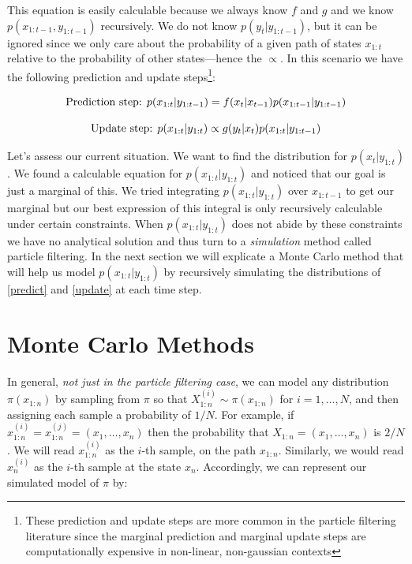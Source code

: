 \documentclass{article}
\begin{document}
\noindent
This equation is easily calculable because we always know $f$ and $g$ and we know $p(x_{1:t-1},y_{1:t-1})$ recursively. We do not know $p(y_t|y_{1:t-1})$, but it can be ignored since we only care about the probability of a given path of states $x_{1:t}$ relative to the probability of other states---hence the $\propto$. In this scenario we have the following prediction and update steps\footnote{These prediction and update steps are more common in the particle filtering literature since the marginal prediction and marginal update steps are computationally expensive in non-linear, non-gaussian contexts}:

\begin{equation} \label{predict}
\textnormal{Prediction step:  }
p(x_{1:t}|y_{1:t-1})= f(x_t|x_{t-1}) p(x_{1:t-1}|y_{1:t-1})
\end{equation}

\begin{equation} \label{update}
\textnormal{Update step:  }
p(x_{1:t}|y_{1:t})\propto g(y_t|x_t)p(x_{1:t}|y_{1:t-1})
\end{equation}

Let's assess our current situation. We want to find the distribution for $p(x_t|y_{1:t})$. We found a calculable equation for $p(x_{1:t}|y_{1:t})$ and noticed that our goal is just a marginal of this. We tried integrating $p(x_{1:t}|y_{1:t})$ over $x_{1:t-1}$ to get our marginal but our best expression of this integral is only recursively calculable under certain constraints. When $p(x_{1:t}|y_{1:t})$ does not abide by these constraints we have no analytical solution and thus turn to a \textit{simulation} method called particle filtering. In the next section we will explicate a Monte Carlo method that will help us model $p(x_{1:t}|y_{1:t})$ by recursively simulating the distributions of \eqref{predict} and \eqref{update} at each time step.

\section{Monte Carlo Methods}

In general, \textit{not just in the particle filtering case}, we can model any distribution $\pi(x_{1:n})$ by sampling from $\pi$ so that $X_{1:n}^{(i)} \sim \pi(x_{1:n})$ for $i=1,\dots,N$, and then assigning each sample a probability of $1/N$. For example, if $x_{1:n}^{(i)} = x_{1:n}^{(j)} = (x_1,\dots,x_n)$ then the probability that $X_{1:n} = (x_1,\dots,x_n)$ is $2/N$. We will read $x_{1:n}^{(i)}$ as the $i$-th sample, on the path $x_{1:n}$. Similarly, we would read $x_{n}^{(i)}$ as the $i$-th sample at the state $x_{n}$. Accordingly, we can represent our simulated model of $\pi$ by:
\end{document}
